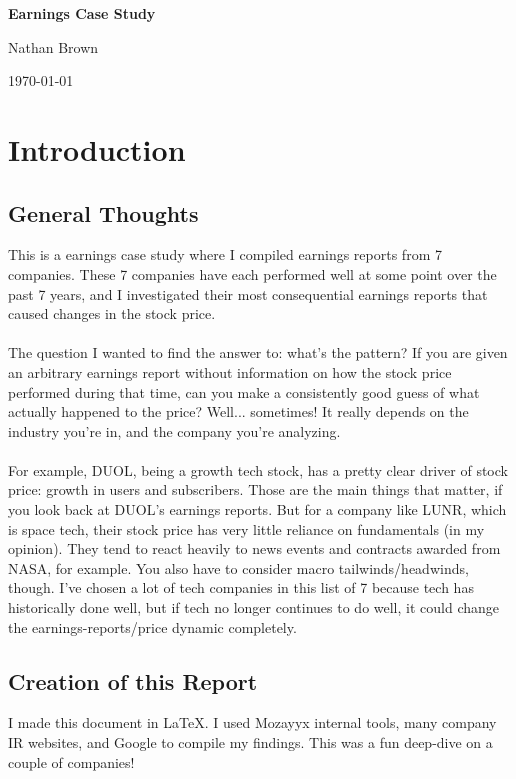 \documentclass[11pt]{article}
\begin{document}
\begin{center}
    \vspace*{0.5cm}
    {\Huge\bfseries Earnings Case Study\par}
    \vspace{0.8cm}
    {\large Nathan Brown\par}
    {\large \today\par}
    \vspace{1cm}
\end{center}

\tableofcontents

\section{Introduction}
    \subsection{General Thoughts}
        This is a earnings case study where I compiled earnings reports from 7 companies. These 7 companies have each performed well at some point over the past 7 years, and I investigated their most consequential earnings reports that caused changes in the stock price. \\\\
        The question I wanted to find the answer to: what's the pattern? If you are given an arbitrary earnings report without information on how the stock price performed during that time, can you make a consistently good guess of what actually happened to the price? Well... sometimes! It really depends on the industry you're in, and the company you're analyzing. \\\\
        For example, DUOL, being a growth tech stock, has a pretty clear driver of stock price: growth in users and subscribers. Those are the main things that matter, if you look back at DUOL's earnings reports. But for a company like LUNR, which is space tech, their stock price has very little reliance on fundamentals (in my opinion). They tend to react heavily to news events and contracts awarded from NASA, for example. You also have to consider macro tailwinds/headwinds, though. I've chosen a lot of tech companies in this list of 7 because tech has historically done well, but if tech no longer continues to do well, it could change the earnings-reports/price dynamic completely.
    \subsection{Creation of this Report}
        I made this document in LaTeX. I used Mozayyx internal tools, many company IR websites, and Google to compile my findings. This was a fun deep-dive on a couple of companies!
\end{document}

